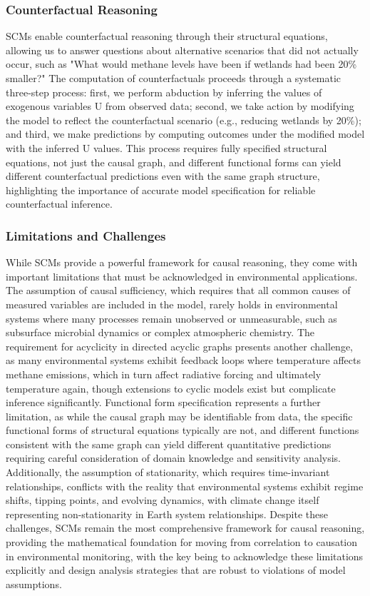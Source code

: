 \subsubsection{Counterfactual Reasoning}

SCMs enable counterfactual reasoning through their structural equations, allowing us to answer questions about alternative scenarios that did not actually occur, such as "What would methane levels have been if wetlands had been 20\% smaller?" The computation of counterfactuals proceeds through a systematic three-step process: first, we perform abduction by inferring the values of exogenous variables U from observed data; second, we take action by modifying the model to reflect the counterfactual scenario (e.g., reducing wetlands by 20\%); and third, we make predictions by computing outcomes under the modified model with the inferred U values. This process requires fully specified structural equations, not just the causal graph, and different functional forms can yield different counterfactual predictions even with the same graph structure, highlighting the importance of accurate model specification for reliable counterfactual inference.

\subsubsection{Limitations and Challenges}

While SCMs provide a powerful framework for causal reasoning, they come with important limitations that must be acknowledged in environmental applications. The assumption of causal sufficiency, which requires that all common causes of measured variables are included in the model, rarely holds in environmental systems where many processes remain unobserved or unmeasurable, such as subsurface microbial dynamics or complex atmospheric chemistry. The requirement for acyclicity in directed acyclic graphs presents another challenge, as many environmental systems exhibit feedback loops where temperature affects methane emissions, which in turn affect radiative forcing and ultimately temperature again, though extensions to cyclic models exist but complicate inference significantly. Functional form specification represents a further limitation, as while the causal graph may be identifiable from data, the specific functional forms of structural equations typically are not, and different functions consistent with the same graph can yield different quantitative predictions requiring careful consideration of domain knowledge and sensitivity analysis. Additionally, the assumption of stationarity, which requires time-invariant relationships, conflicts with the reality that environmental systems exhibit regime shifts, tipping points, and evolving dynamics, with climate change itself representing non-stationarity in Earth system relationships. Despite these challenges, SCMs remain the most comprehensive framework for causal reasoning, providing the mathematical foundation for moving from correlation to causation in environmental monitoring, with the key being to acknowledge these limitations explicitly and design analysis strategies that are robust to violations of model assumptions.

